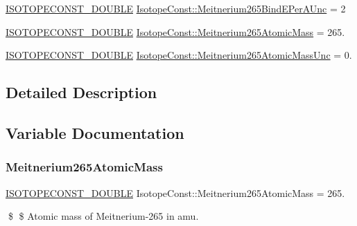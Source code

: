 \begin{DoxyCompactItemize}
\mbox{\hyperlink{group___isotope_const-_macros_ga8f45a7272ce02c0b4c65c44636ed719a}{I\+S\+O\+T\+O\+P\+E\+C\+O\+N\+S\+T\+\_\+\+D\+O\+U\+B\+LE}} \mbox{\hyperlink{group___isotope_const-_meitnerium-_mt265_ga4679a5b4d7aac832826ac040e1c5f283}{Isotope\+Const\+::\+Meitnerium265\+Bind\+E\+Per\+A\+Unc}} = 2
\item 
\mbox{\hyperlink{group___isotope_const-_macros_ga8f45a7272ce02c0b4c65c44636ed719a}{I\+S\+O\+T\+O\+P\+E\+C\+O\+N\+S\+T\+\_\+\+D\+O\+U\+B\+LE}} \mbox{\hyperlink{group___isotope_const-_meitnerium-_mt265_gad29cb24afc3062376bab69823e471259}{Isotope\+Const\+::\+Meitnerium265\+Atomic\+Mass}} = 265.
\item 
\mbox{\hyperlink{group___isotope_const-_macros_ga8f45a7272ce02c0b4c65c44636ed719a}{I\+S\+O\+T\+O\+P\+E\+C\+O\+N\+S\+T\+\_\+\+D\+O\+U\+B\+LE}} \mbox{\hyperlink{group___isotope_const-_meitnerium-_mt265_ga564b5b68ddb303610a38cd882244d999}{Isotope\+Const\+::\+Meitnerium265\+Atomic\+Mass\+Unc}} = 0.
\end{DoxyCompactItemize}


\subsection{Detailed Description}


\subsection{Variable Documentation}
\mbox{\label{group___isotope_const-_meitnerium-_mt265_gad29cb24afc3062376bab69823e471259}} 
\subsubsection{\texorpdfstring{Meitnerium265\+Atomic\+Mass}{Meitnerium265AtomicMass}}
{\footnotesize\ttfamily \mbox{\hyperlink{group___isotope_const-_macros_ga8f45a7272ce02c0b4c65c44636ed719a}{I\+S\+O\+T\+O\+P\+E\+C\+O\+N\+S\+T\+\_\+\+D\+O\+U\+B\+LE}} Isotope\+Const\+::\+Meitnerium265\+Atomic\+Mass = 265.}

\$ \$ Atomic mass of Meitnerium-\/265 in amu. \mbox{\label{group___isotope_const-_meitnerium-_mt265_ga564b5b68ddb303610a38cd882244d999}} 
